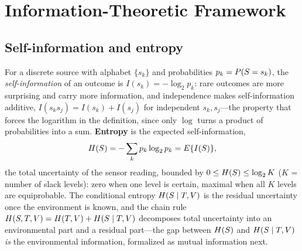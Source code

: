 \section{Information-Theoretic Framework}
\label{sec:theory}


\subsection{Self-information and entropy}
\label{sec:th-entropy}
For a discrete source with alphabet $\{s_k\}$ and probabilities $p_k=P(S=s_k)$,
the \emph{self-information} of an outcome is $I(s_k)=-\log_2 p_k$: rare outcomes
are more surprising and carry more information, and independence makes
self-information additive, $I(s_ks_j)=I(s_k)+I(s_j)$ for independent $s_k,s_j$---the
property that forces the logarithm in the definition, since only $\log$ turns a
product of probabilities into a sum. \textbf{Entropy} is the expected
self-information,
\begin{equation}
  H\!\left(S\right) = -\sum_k p_k\log_2 p_k = E\{I(S)\},
  \label{eq:entropy}
\end{equation}
the total uncertainty of the sensor reading, bounded by $0\le H\!\left(S\right)\le\log_2 K$
($K$ = number of slack levels): zero when one level is certain, maximal when all
$K$ levels are equiprobable. The conditional entropy
$H\!\left(S\mid T,V\right)$ is the residual uncertainty once the environment is
known, and the chain rule $H\!\left(S,T,V\right)=H\!\left(T,V\right)+H\!\left(S\mid T,V\right)$
decomposes total uncertainty into an environmental part and a residual part---the
gap between $H\!\left(S\right)$ and $H\!\left(S\mid T,V\right)$ \emph{is} the
environmental information, formalized as mutual information next.

